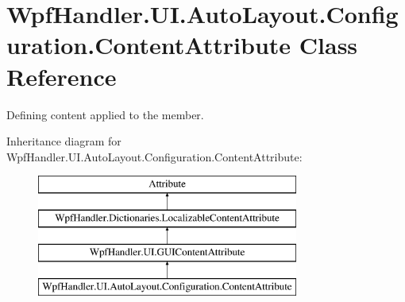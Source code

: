 \hypertarget{class_wpf_handler_1_1_u_i_1_1_auto_layout_1_1_configuration_1_1_content_attribute}{}\section{Wpf\+Handler.\+U\+I.\+Auto\+Layout.\+Configuration.\+Content\+Attribute Class Reference}
\label{class_wpf_handler_1_1_u_i_1_1_auto_layout_1_1_configuration_1_1_content_attribute}


Defining content applied to the member.  


Inheritance diagram for Wpf\+Handler.\+U\+I.\+Auto\+Layout.\+Configuration.\+Content\+Attribute\+:\begin{figure}[H]
\begin{center}
\leavevmode
\includegraphics[height=4.000000cm]{d2/dfc/class_wpf_handler_1_1_u_i_1_1_auto_layout_1_1_configuration_1_1_content_attribute}
\end{center}
\end{figure}
